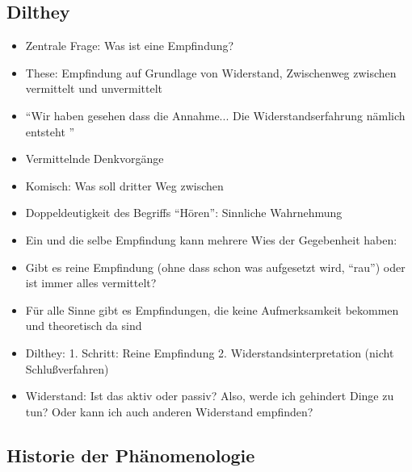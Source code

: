 \documentclass[emulatestandardclasses]{scrartcl}
\begin{document}
\subsection{Dilthey}

\begin{itemize}
  \item Zentrale Frage: Was ist eine Empfindung?
  \item These: Empfindung auf Grundlage von Widerstand, Zwischenweg zwischen vermittelt und unvermittelt
  \item "`Wir haben gesehen dass die Annahme... Die Widerstandserfahrung nämlich entsteht "'
  \item Vermittelnde Denkvorgänge
  \item Komisch: Was soll dritter Weg zwischen 
  \item Doppeldeutigkeit des Begriffs "`Hören"': Sinnliche Wahrnehmung
  \item Ein und die selbe Empfindung kann mehrere Wies der Gegebenheit haben: 
  \item Gibt es reine Empfindung (ohne dass schon was aufgesetzt wird, "`rau"') oder ist immer alles vermittelt?
  \item Für alle Sinne gibt es Empfindungen, die keine Aufmerksamkeit bekommen und theoretisch da sind
  \item Dilthey: 1. Schritt: Reine Empfindung 2. Widerstandsinterpretation (nicht Schlußverfahren)
  \item Widerstand: Ist das aktiv oder passiv? Also, werde ich gehindert Dinge zu tun? Oder kann ich auch anderen Widerstand empfinden?
\end{itemize}

\subsection{Historie der Phänomenologie}
\end{document}
